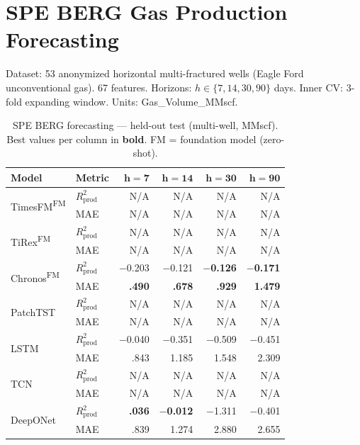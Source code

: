 \documentclass[11pt]{article}
\newcommand{\best}[1]{\textbf{#1}}
\newcommand{\fm}{\textsuperscript{FM}}
\newcommand{\rp}{R^2_\text{prod}}
\begin{document}
\newpage
\section{SPE BERG Gas Production Forecasting}

Dataset: 53 anonymized horizontal multi-fractured wells (Eagle Ford unconventional gas).
67 features. Horizons: $h \in \{7, 14, 30, 90\}$ days.
Inner CV: 3-fold expanding window. Units: Gas\_Volume\_MMscf.

\begin{table}[ht]
\centering
\caption{SPE BERG forecasting — held-out test (multi-well, MMscf).
Best values per column in \textbf{bold}.
FM = foundation model (zero-shot).}
\label{tab:spe_berg_main}
\small
\setlength{\tabcolsep}{2.5pt}
\begin{tabular}{@{}ll rrrr @{}}
\toprule
\textbf{Model} & \textbf{Metric} & $\boldsymbol{h{=}7}$ & $\boldsymbol{h{=}14}$ & $\boldsymbol{h{=}30}$ & $\boldsymbol{h{=}90}$ \\
\midrule
\multirow{2}{*}{TimesFM\fm}
 & $\rp$ & N/A & N/A & N/A & N/A \\
 & MAE   & N/A & N/A & N/A & N/A \\
\midrule
\multirow{2}{*}{TiRex\fm}
 & $\rp$ & N/A & N/A & N/A & N/A \\
 & MAE   & N/A & N/A & N/A & N/A \\
\midrule
\multirow{2}{*}{Chronos\fm}
 & $\rp$ & $-$0.203 & $-$0.121 & \best{$-$0.126} & \best{$-$0.171} \\
 & MAE   & \best{.490} & \best{.678} & \best{.929} & \best{1.479} \\
\midrule
\multirow{2}{*}{PatchTST}
 & $\rp$ & N/A & N/A & N/A & N/A \\
 & MAE   & N/A & N/A & N/A & N/A \\
\midrule
\multirow{2}{*}{LSTM}
 & $\rp$ & $-$0.040 & $-$0.351 & $-$0.509 & $-$0.451 \\
 & MAE   & .843 & 1.185 & 1.548 & 2.309 \\
\midrule
\multirow{2}{*}{TCN}
 & $\rp$ & N/A & N/A & N/A & N/A \\
 & MAE   & N/A & N/A & N/A & N/A \\
\midrule
\multirow{2}{*}{DeepONet}
 & $\rp$ & \best{.036} & \best{$-$0.012} & $-$1.311 & $-$0.401 \\
 & MAE   & .839 & 1.274 & 2.880 & 2.655 \\
\bottomrule
\end{tabular}
\end{table}
\end{document}
